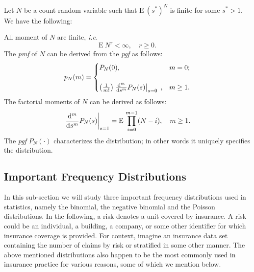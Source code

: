 \documentclass[]{book}
\theoremstyle{definition}
\theoremstyle{definition}
\theoremstyle{definition}
\theoremstyle{remark}
\let\BeginKnitrBlock\begin \let\EndKnitrBlock\end
\begin{document}
\BeginKnitrBlock{theorem}
\protect\hypertarget{thm:pgfthm}{}{\label{thm:pgfthm} }Let \(N\) be a count
random variable such that \(\mathrm{E}~{(s^{\ast})^N}\) is finite for
some \(s^\ast>1\). We have the following:

All moment of \(N\) are finite, \emph{i.e.} \[
\mathrm{E}~{N^r}<\infty, \quad r\geq 0.
\] The \emph{pmf} of \(N\) can be derived from the \emph{pgf} as
follows: \[
p_N(m)=\begin{cases}
P_N(0), &m=0;\cr
&\cr
\left(\frac{1}{m!}\right) \left.\frac{{\rm d}^m}{{\rm d}s^m} P_N(s)\right\vert_{s=0}\;, &m\geq 1.\cr
\end{cases}
\] The factorial moments of \(N\) can be derived as follows: \[
\left.\frac{{\rm d}^m}{{\rm d}s^m} P_N(s)\right\vert_{s=1}=\mathrm{E}~{\prod\limits_{i=0}^{m-1} (N-i)}, \quad m\geq 1.
\] The \emph{pgf} \(P_N(\cdot)\) characterizes the distribution; in
other words it uniquely specifies the distribution.
\EndKnitrBlock{theorem}

\subsection{Important Frequency
Distributions}\label{S:important-frequency-distributions}

In this sub-section we will study three important frequency
distributions used in statistics, namely the binomial, the negative
binomial and the Poisson distributions. In the following, a risk denotes
a unit covered by insurance. A risk could be an individual, a building,
a company, or some other identifier for which insurance coverage is
provided. For context, imagine an insurance data set containing the
number of claims by risk or stratified in some other manner. The above
mentioned distributions also happen to be the most commonly used in
insurance practice for various reasons, some of which we mention below.
\end{document}
